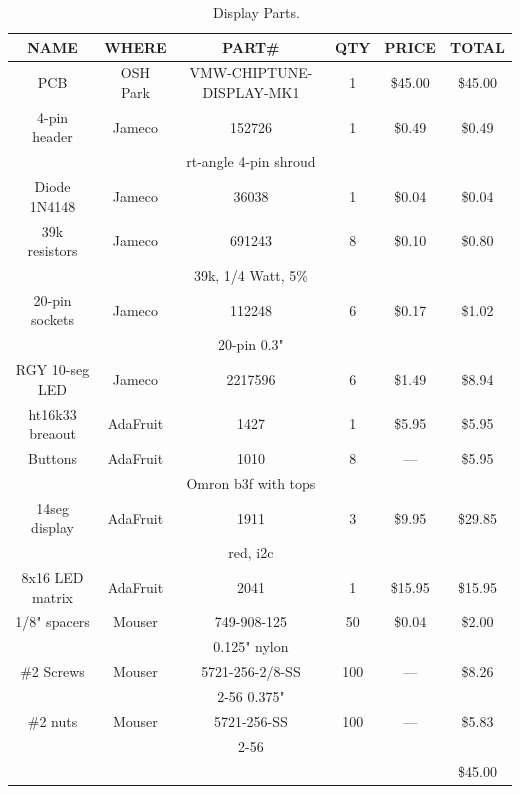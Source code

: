 \documentclass[11pt]{article}
\begin{document}
\begin{table}

\caption{Display Parts.~\label{table:display_parts}}
\centering
\begin{tabular}{|c|c|c|c|c|c|}
\hline
NAME		& WHERE		& PART\#	           & QTY & PRICE    & TOTAL \\
\hline
\hline
PCB		& OSH Park	& VMW-CHIPTUNE-DISPLAY-MK1 & 1	 & \$45.00  & \$45.00 \\
\hline
4-pin header	& Jameco	& 152726		   & 1	 & \$0.49   &  \$0.49 \\
		&		& rt-angle 4-pin shroud	   &	 &          &         \\
\hline
Diode 1N4148	& Jameco	& 36038		           & 1	 & \$0.04   &  \$0.04 \\
\hline
39k resistors	& Jameco	& 691243		   & 8   &  \$0.10  &  \$0.80 \\
		&		& 39k, 1/4 Watt, 5\%	   &     &          &         \\
\hline
20-pin sockets	& Jameco	& 112248		   & 6	 &  \$0.17  &  \$1.02 \\
		&		& 20-pin 0.3"		   &     &          &         \\
\hline
RGY 10-seg LED	& Jameco	& 2217596		   & 6	 &  \$1.49  &  \$8.94 \\
\hline
ht16k33 breaout	& AdaFruit	& 1427		           & 1	 & \$5.95   &  \$5.95 \\
\hline
Buttons		& AdaFruit	& 1010			   & 8	 & ---	    &  \$5.95 \\
		&		& Omron b3f with tops	   &     &          &         \\
\hline
14seg display	& AdaFruit	& 1911			   & 3	 & \$9.95   & \$29.85 \\
		&		& red, i2c		   &	 &          &	      \\  
\hline
8x16 LED matrix	& AdaFruit	& 2041			   & 1	 & \$15.95  & \$15.95 \\
\hline

1/8" spacers	& Mouser	& 749-908-125		   & 50  & \$0.04   & \$2.00  \\
		& 		& 0.125" nylon		   &     &          &         \\
\hline
\#2 Screws	& Mouser	& 5721-256-2/8-SS	   & 100 & --- 	    & \$8.26  \\
		&		& 2-56 0.375"		   &     &          &         \\
\hline
\#2 nuts	& Mouser	& 5721-256-SS	   	   & 100 & --- 	    & \$5.83  \\
		&		& 2-56		   	   &     &          &         \\
\hline
\hline
		&		&		&	&		& \$45.00 \\
\hline
\end{tabular}
\end{table}
\end{document}
